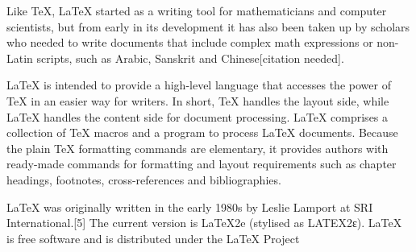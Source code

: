 Like TeX, LaTeX started as a writing tool for mathematicians and computer scientists, but from early in its development it has also been taken up by scholars who needed to write documents that include complex math expressions or non-Latin scripts, such as Arabic, Sanskrit and Chinese[citation needed].

LaTeX is intended to provide a high-level language that accesses the power of TeX in an easier way for writers. In short, TeX handles the layout side, while LaTeX handles the content side for document processing. LaTeX comprises a collection of TeX macros and a program to process LaTeX documents. Because the plain TeX formatting commands are elementary, it provides authors with ready-made commands for formatting and layout requirements such as chapter headings, footnotes, cross-references and bibliographies.

LaTeX was originally written in the early 1980s by Leslie Lamport at SRI International.[5] The current version is LaTeX2e (stylised as LATEX2ε). LaTeX is free software and is distributed under the LaTeX Project 
